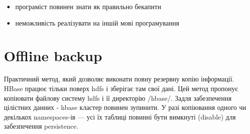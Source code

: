 \begin{itemize}
    \item програміст повинен знати як правильно бекапити
    \item неможливість реалізувати на іншій мові програмування
\end{itemize}

\section{Offline backup}
Практичний метод, який дозволяє виконати повну резервну копію інформації.
HBase працює тільки поверх hdfs і зберігає там свої дані.
Цей метод пропонує копіювати файлову систему hdfs і її директорію /hbase/.
Задля забезпечення цілістних данних - hbase кластер повинен зупинити.
У разі копіювання одного чи декількох namespaces-ів --- усі їх таблиці повинні бути вимкнуті (disable) для забезпечення persistence.

\begin{comment}
LipNet is the first end-to-end model that performs sentence-level sequence prediction for visual speech recogntion. That is, we 
demonstrate the first work that takes as input as sequence of images and outputs a distribution over sequences of tokens; it is 
trained end-to-end using CTC and thus also does not require alignments.
\end{comment}
